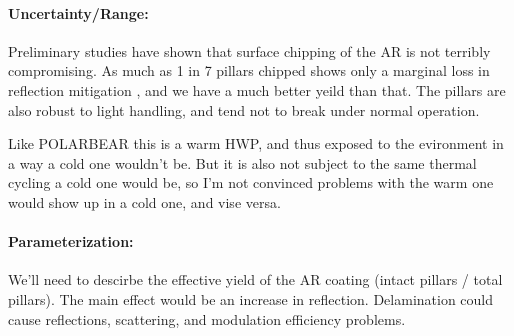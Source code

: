 \paragraph{Uncertainty/Range:}

Preliminary studies have shown that surface chipping of the AR is not terribly compromising. As much as 1 in 7 pillars chipped shows only a marginal loss in reflection mitigation \cite{SiAR_1}, and we have a much better yeild than that.  The pillars are also robust to light handling, and tend not to break under normal operation.

Like POLARBEAR this is a warm HWP, and thus exposed to the evironment in a way a cold one wouldn't be. But it is also not subject to the same thermal cycling a cold one would be, so I'm not convinced problems with the warm one would show up in a cold one, and vise versa.

\paragraph{Parameterization:}
We'll need to descirbe the effective yield of the AR coating (intact pillars / total pillars).  The main effect would be an increase in reflection.  Delamination could cause reflections, scattering, and modulation efficiency problems.  

